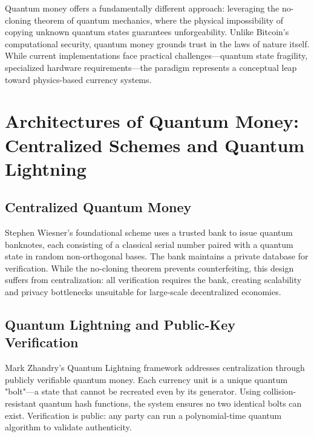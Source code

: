 \documentclass[a4paper,10.5pt,twoside]{article}
\begin{document}
Quantum money offers a fundamentally different approach: leveraging the no-cloning theorem of quantum mechanics,\autocite{Nielsen_Chuang_2010} where the physical impossibility of copying unknown quantum states guarantees unforgeability. Unlike Bitcoin's computational security, quantum money grounds trust in the laws of nature itself. While current implementations face practical challenges—quantum state fragility, specialized hardware requirements—the paradigm represents a conceptual leap toward physics-based currency systems.



\section{Architectures of Quantum Money: Centralized Schemes and Quantum Lightning}\label{s:2}

\subsection{Centralized Quantum Money}\label{s:2.1}

Stephen Wiesner's foundational scheme\autocite{Wiesner_1983} uses a trusted bank to issue quantum banknotes, each consisting of a classical serial number paired with a quantum state in random non-orthogonal bases. The bank maintains a private database for verification. While the no-cloning theorem prevents counterfeiting, this design suffers from centralization: all verification requires the bank, creating scalability and privacy bottlenecks unsuitable for large-scale decentralized economies.

\subsection{Quantum Lightning and Public-Key Verification}\label{s:2.2}

Mark Zhandry's Quantum Lightning framework\autocite{Zhandry_2019} addresses centralization through publicly verifiable quantum money. Each currency unit is a unique quantum "bolt"—a state that cannot be recreated even by its generator. Using collision-resistant quantum hash functions, the system ensures no two identical bolts can exist. Verification is public: any party can run a polynomial-time quantum algorithm to validate authenticity.
\end{document}
